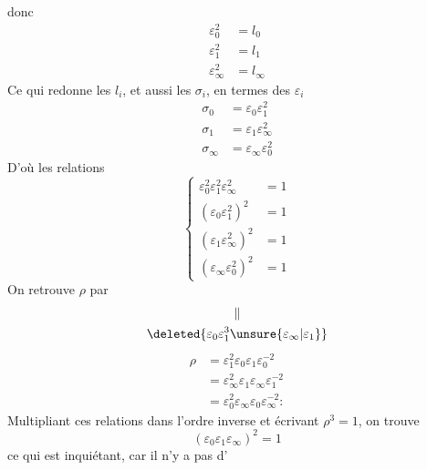 donc
\[
\begin{aligned}
\varepsilon_0^2&=l_0\\
\varepsilon_1^2&=l_1\\
\varepsilon_\infty^2&=l_\infty
\end{aligned}
\]
Ce qui redonne les $l_i$, et aussi les $\sigma_i$,  en termes des $\varepsilon_i$
\[
\begin{aligned}
\sigma_0&=\varepsilon_0\varepsilon_1^2\\
\sigma_1&=\varepsilon_1\varepsilon_\infty^2\\
\sigma_\infty&=\varepsilon_\infty\varepsilon_0^2
\end{aligned}
\]
D'où les relations
\[
\left\{\begin{aligned}
\varepsilon_0^2\varepsilon_1^2\varepsilon_\infty^2&=1\\
(\varepsilon_0\varepsilon_1^2)^2&=1\\
(\varepsilon_1\varepsilon_\infty^2)^2&=1\\
(\varepsilon_\infty\varepsilon_0^2)^2&=1
\end{aligned}\right.
\]
On retrouve $\rho$  par
\deleted{\[
\rho=\sigma_0\sigma_1=\sigma_1\sigma_\infty=\sigma_\infty\sigma_0
\]}
\[
\begin{gathered}
\Vert\\
\deleted{\varepsilon_0\varepsilon_1^3\unsure{\varepsilon_\infty|\varepsilon_1}}
\end{gathered}
\]
\inserted{\[
\sigma_0\sigma_1=l_1^{-1}\rho
\]}
\[
\begin{aligned}
\rho&=\varepsilon_1^2\varepsilon_0\varepsilon_1\varepsilon_0^{-2}\\
&=\varepsilon_\infty^2\varepsilon_1\varepsilon_\infty\varepsilon_1^{-2}\\
&=\varepsilon_0^2\varepsilon_\infty\varepsilon_0\varepsilon_\infty^{-2}:
\end{aligned}
\]
Multipliant  ces relations dans l'ordre inverse et écrivant $\rho^3=1$, on trouve
\[
(\varepsilon_0\varepsilon_1\varepsilon_\infty)^2=1
\]
ce qui est inquiétant, car il n'y a pas d'

